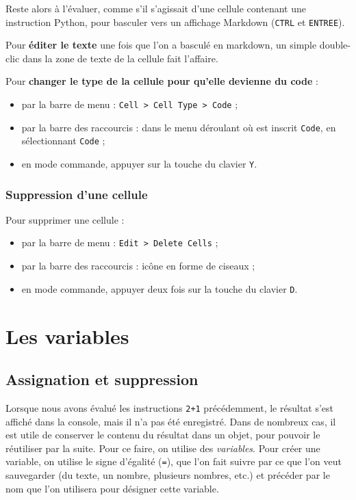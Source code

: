 \documentclass[12pt,]{book}
\providecommand{\tightlist}{%
  \setlength{\itemsep}{0pt}\setlength{\parskip}{0pt}}
\numberwithin{equation}{section}
\numberwithin{countremarque}{section}
\begin{document}
Reste alors à l'évaluer, comme s'il s'agissait d'une cellule contenant
une instruction Python, pour basculer vers un affichage Markdown
(\texttt{CTRL} et \texttt{ENTREE}).

Pour \textbf{éditer le texte} une fois que l'on a basculé en markdown,
un simple double-clic dans la zone de texte de la cellule fait
l'affaire.

Pour \textbf{changer le type de la cellule pour qu'elle devienne du
code} :

\begin{itemize}
\tightlist
\item
  par la barre de menu :
  \texttt{Cell\ \textgreater{}\ Cell\ Type\ \textgreater{}\ Code} ;
\item
  par la barre des raccourcis : dans le menu déroulant où est inscrit
  \texttt{Code}, en sélectionnant \texttt{Code} ;
\item
  en mode commande, appuyer sur la touche du clavier \texttt{Y}.
\end{itemize}

\subsubsection{Suppression d'une
cellule}\label{suppression-dune-cellule}

Pour supprimer une cellule :

\begin{itemize}
\tightlist
\item
  par la barre de menu : \texttt{Edit\ \textgreater{}\ Delete\ Cells} ;
\item
  par la barre des raccourcis : icône en forme de ciseaux ;
\item
  en mode commande, appuyer deux fois sur la touche du clavier
  \texttt{D}.
\end{itemize}

\section{Les variables}\label{les-variables}

\subsection{Assignation et
suppression}\label{assignation-et-suppression}

Lorsque nous avons évalué les instructions \texttt{2+1} précédemment, le
résultat s'est affiché dans la console, mais il n'a pas été enregistré.
Dans de nombreux cas, il est utile de conserver le contenu du résultat
dans un objet, pour pouvoir le réutiliser par la suite. Pour ce faire,
on utilise des \emph{variables}. Pour créer une variable, on utilise le
signe d'égalité (\texttt{=}), que l'on fait suivre par ce que l'on veut
sauvegarder (du texte, un nombre, plusieurs nombres, etc.) et précéder
par le nom que l'on utilisera pour désigner cette variable.
\end{document}
